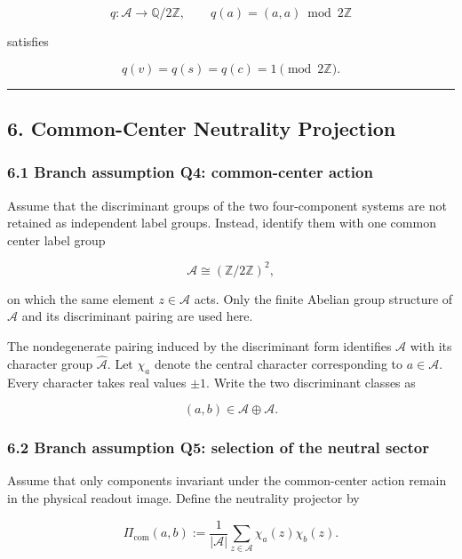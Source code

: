 \documentclass[
  a4paper,
]{article}
\begin{document}
\[
q:
\mathcal A
\longrightarrow
\mathbb Q/2\mathbb Z,
\qquad
q(a)
=
(a,a)
\bmod
2\mathbb Z
\]

satisfies

\[
q(v)
=
q(s)
=
q(c)
=1
\pmod{2\mathbb Z}.
\]

\begin{center}\rule{0.5\linewidth}{0.5pt}\end{center}

\subsection{6. Common-Center Neutrality
Projection}\label{common-center-neutrality-projection}

\subsubsection{6.1 Branch assumption Q4: common-center
action}\label{branch-assumption-q4-common-center-action}

Assume that the discriminant groups of the two four-component systems
are not retained as independent label groups. Instead, identify them
with one common center label group

\[
\mathcal A
\cong
(\mathbb Z/2\mathbb Z)^2,
\]

on which the same element \(z\in\mathcal A\) acts. Only the finite
Abelian group structure of \(\mathcal A\) and its discriminant pairing
are used here.

The nondegenerate pairing induced by the discriminant form identifies
\(\mathcal A\) with its character group \(\widehat{\mathcal A}\). Let
\(\chi_a\) denote the central character corresponding to
\(a\in\mathcal A\). Every character takes real values \(\pm1\). Write
the two discriminant classes as

\[
(a,b)
\in
\mathcal A\oplus\mathcal A.
\]

\subsubsection{6.2 Branch assumption Q5: selection of the neutral
sector}\label{branch-assumption-q5-selection-of-the-neutral-sector}

Assume that only components invariant under the common-center action
remain in the physical readout image. Define the neutrality projector by

\[
\Pi_{\mathrm{com}}(a,b)
:=
\frac{1}{|\mathcal A|}
\sum_{z\in\mathcal A}
\chi_a(z)\chi_b(z).
\]
\end{document}
